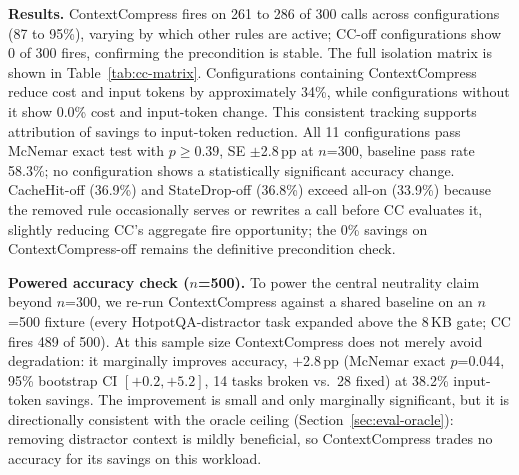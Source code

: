 \documentclass[sigconf,9pt]{acmart}
\begin{document}
\textbf{Results.} ContextCompress fires on 261 to 286 of 300 calls across
configurations (87 to 95\%), varying by which other rules are active; CC-off
configurations show 0 of 300 fires, confirming the precondition is stable. The full
isolation matrix is shown in Table~\ref{tab:cc-matrix}. Configurations containing
ContextCompress reduce cost and input tokens by approximately 34\%, while
configurations without it show 0.0\% cost and input-token change. This consistent
tracking supports attribution of savings to input-token reduction. All 11
configurations pass McNemar exact test with $p \geq 0.39$, SE $\pm$2.8\,pp at
$n$=300, baseline pass rate 58.3\%; no configuration shows a statistically significant
accuracy change. CacheHit-off (36.9\%) and StateDrop-off (36.8\%) exceed all-on
(33.9\%) because the removed rule occasionally serves or rewrites a call before CC
evaluates it, slightly reducing CC's aggregate fire opportunity; the 0\% savings on
ContextCompress-off remains the definitive precondition check.

\textbf{Powered accuracy check ($n$=500).} To power the central neutrality claim beyond
$n$=300, we re-run ContextCompress against a shared baseline on an $n$=500 fixture (every
HotpotQA-distractor task expanded above the 8\,KB gate; CC fires 489 of 500). At this
sample size ContextCompress does not merely avoid degradation: it marginally improves
accuracy, $+$2.8\,pp (McNemar exact $p$=0.044, 95\% bootstrap CI $[+0.2,+5.2]$, 14 tasks
broken vs.\ 28 fixed) at 38.2\% input-token savings. The improvement is small and only
marginally significant, but it is directionally consistent with the oracle ceiling
(Section~\ref{sec:eval-oracle}): removing distractor context is mildly beneficial, so
ContextCompress trades no accuracy for its savings on this workload.
\end{document}
